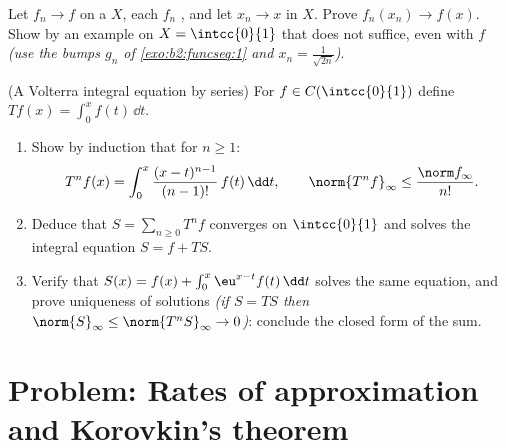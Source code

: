 \begin{exercise}[$\star\star$]\label{exo:b2:funcseq:11}
Let $f_n \to f$  on a  $X$, each $f_n$
, and let $x_n \to x$ in $X$. Prove $f_n(x_n) \to
f(x)$. Show by an example on $X = \intcc{0}{1}$ that  does not suffice, even with $f$ 
\emph{(use the bumps $g_n$ of \cref{exo:b2:funcseq:1} and $x_n =
\frac{1}{\sqrt{2n}}$)}.
\end{exercise}

\begin{exercise}[$\star\star\star$]\label{exo:b2:funcseq:12}
(A Volterra integral equation by series) For $f \in
C(\intcc{0}{1})$ define $Tf(x) = \int_0^x f(t)\,\dd t$.
\begin{enumerate}
  \item Show by induction that for $n \geq 1$:
        \[
        T^n f(x) = \int_0^x \frac{(x -
        t)^{n-1}}{(n-1)!}\,f(t)\,\dd t,
        \qquad
        \norm{T^n f}_\infty \leq \frac{\norm f_\infty}{n!} .
        \]
  \item Deduce that $S = \sum_{n\geq0} T^n f$ converges 
        on $\intcc{0}{1}$ and solves the integral equation $S = f
        + TS$.
  \item Verify that $S(x) = f(x) + \int_0^x \eu^{x-t}f(t)\,\dd
        t$ solves the same equation, and prove uniqueness of
         solutions \emph{(if $S = TS$ then
        $\norm{S}_\infty \leq \norm{T^nS}_\infty \to 0$)}:
        conclude the closed form of the sum.
\end{enumerate}
\end{exercise}

\section{Problem: Rates of approximation and Korovkin's theorem}

